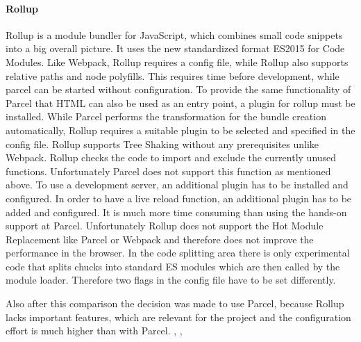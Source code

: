 \paragraph{Rollup}
\label{par:tecRollup}
Rollup is a module bundler for JavaScript, which combines small code snippets into a big overall picture. It uses the new standardized format ES2015 for Code Modules. Like Webpack, Rollup requires a config file, while Rollup also supports relative paths and node polyfills. This requires time before development, while parcel can be started without configuration. To provide the same functionality of Parcel that HTML can also be used as an entry point, a plugin for rollup must be installed. While Parcel performs the transformation for the bundle creation automatically, Rollup requires a suitable plugin to be selected and specified in the config file.  Rollup supports Tree Shaking without any prerequisites unlike Webpack. Rollup checks the code to import and exclude the currently unused functions. Unfortunately Parcel does not support this function as mentioned above. To use a development server, an additional plugin has to be installed and configured. In order to have a live reload function, an additional plugin has to be added and configured. It is much more time consuming than using the hands-on support at Parcel. Unfortunately Rollup does not support the Hot Module Replacement like Parcel or Webpack and therefore does not improve the performance in the browser. In the code splitting area there is only experimental code that splits chucks into standard ES modules which are then called by the module loader. Therefore two flags in the config file have to be set differently.

Also after this comparison the decision was made to use Parcel, because Rollup lacks important features, which are relevant for the project and the configuration effort is much higher than with Parcel. \cite{Bhatia2018}, \cite{WebpackAuthors2019}, \cite{rollupJs-Authors2019}

